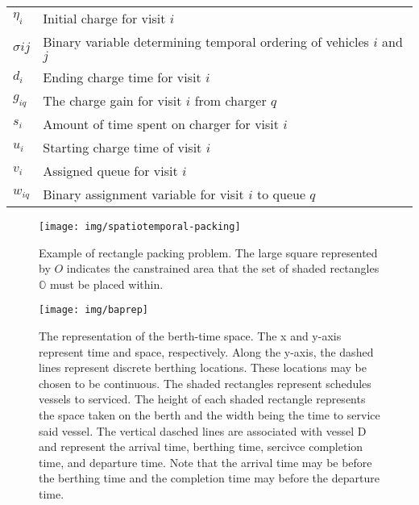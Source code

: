 \documentclass[utf8]{FrontiersinHarvard}
\begin{document}
\begin{table}[!htpb]
\begin{tabularx}{\textwidth}{l l}
    $\eta_i$    & Initial charge for visit $i$                                                                                \\
    $\sigma{ij}$ & Binary variable determining temporal ordering of vehicles $i$ and $j$                                       \\
    $d_i$    & Ending charge time for visit $i$                                                                            \\
    $g_{iq}$ & The charge gain for visit $i$ from charger $q$                                                              \\
    $s_i$    & Amount of time spent on charger for visit $i$                                                               \\
    $u_i$    & Starting charge time of visit $i$                                                                           \\
    $v_i$    & Assigned queue for visit $i$                                                                                \\
    $w_{iq}$ & Binary assignment variable for visit $i$ to queue $q$                                                       \\
    \bottomrule
  \end{tabularx}
\end{table}

\begin{figure}[htpb]
\centering
    \texttt{[image: img/spatiotemporal-packing]}
    \caption{Example of rectangle packing problem. The large square represented by $O$ indicates the canstrained area that the set of shaded rectangles $\mathbb{O}$ must be placed within.}
    \label{fig:packexample}
\end{figure}

\begin{figure}[ht]
\centering
    \texttt{[image: img/baprep]}
    \caption{The representation of the berth-time space. The x and y-axis represent time and space, respectively. Along the y-axis, the dashed lines represent discrete berthing locations. These locations may be chosen to be continuous. The shaded rectangles represent schedules vessels to serviced. The height of each shaded rectangle represents the space taken on the berth and the width being the time to service said vessel. The vertical dasched lines are associated with vessel D and represent the arrival time, berthing time, sercivce completion time, and departure time. Note that the arrival time may be before the berthing time and the completion time may before the departure time.}
    \label{fig:bap}
\end{figure}
\end{document}
